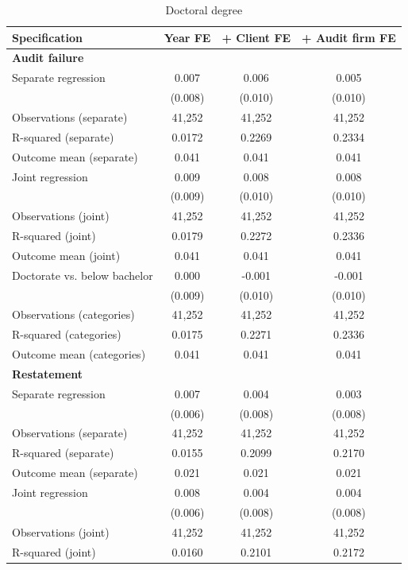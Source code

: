 \begin{table}[htbp]
\footnotesize
\centering
\caption{Doctoral degree}
\begin{threeparttable}
\begin{tabular}{p{}ccc}
\toprule
Specification & Year FE & + Client FE & + Audit firm FE \\
\midrule
\multicolumn{4}{l}{\textbf{Audit failure}} \\
Separate regression & 0.007 & 0.006 & 0.005 \\
 & (0.008) & (0.010) & (0.010) \\
Observations (separate) & 41,252 & 41,252 & 41,252 \\
R-squared (separate) & 0.0172 & 0.2269 & 0.2334 \\
Outcome mean (separate) & 0.041 & 0.041 & 0.041 \\
Joint regression & 0.009 & 0.008 & 0.008 \\
 & (0.009) & (0.010) & (0.010) \\
Observations (joint) & 41,252 & 41,252 & 41,252 \\
R-squared (joint) & 0.0179 & 0.2272 & 0.2336 \\
Outcome mean (joint) & 0.041 & 0.041 & 0.041 \\
Doctorate vs. below bachelor & 0.000 & -0.001 & -0.001 \\
 & (0.009) & (0.010) & (0.010) \\
Observations (categories) & 41,252 & 41,252 & 41,252 \\
R-squared (categories) & 0.0175 & 0.2271 & 0.2336 \\
Outcome mean (categories) & 0.041 & 0.041 & 0.041 \\
\multicolumn{4}{l}{\textbf{Restatement}} \\
Separate regression & 0.007 & 0.004 & 0.003 \\
 & (0.006) & (0.008) & (0.008) \\
Observations (separate) & 41,252 & 41,252 & 41,252 \\
R-squared (separate) & 0.0155 & 0.2099 & 0.2170 \\
Outcome mean (separate) & 0.021 & 0.021 & 0.021 \\
Joint regression & 0.008 & 0.004 & 0.004 \\
 & (0.006) & (0.008) & (0.008) \\
Observations (joint) & 41,252 & 41,252 & 41,252 \\
R-squared (joint) & 0.0160 & 0.2101 & 0.2172 \\

\end{tabular}
\end{threeparttable}
\end{table}
